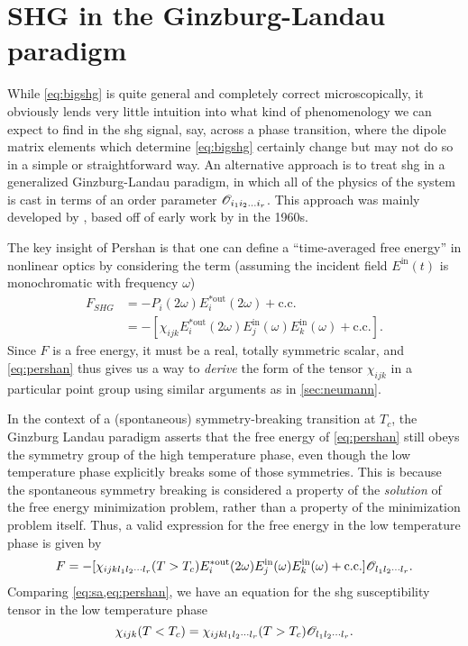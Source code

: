\section{SHG in the Ginzburg-Landau paradigm}

While \cref{eq:bigshg} is quite general and completely correct microscopically, it obviously lends very little intuition into what kind of phenomenology we can expect to find in the \gls{shg} signal, say, across a phase transition, where the dipole matrix elements which determine \cref{eq:bigshg} certainly change but may not do so in a simple or straightforward way.
An alternative approach is to treat \gls{shg} in a generalized Ginzburg-Landau paradigm, in which all of the physics of the system is cast in terms of an order parameter $\mathscr{O}_{i_1i_2...i_r}$.
This approach was mainly developed by \citet{sa_generalized_2000}, based off of early work by \citet{pershan_nonlinear_1963} in the 1960s.

The key insight of Pershan is that one can define a ``time-averaged free energy'' in nonlinear optics by considering the term (assuming the incident field $E^\mathrm{in}(t)$ is monochromatic with frequency $\omega$)
\begin{align}
F_{SHG} &= -P_i(2\omega)E_i^{*\mathrm{out}}(2\omega)+\mathrm{c.c.}\\
&= -[\chi_{ijk}E_i^{*\mathrm{out}}(2\omega)E_j^\mathrm{in}(\omega)E_k^\mathrm{in}(\omega)+\mathrm{c.c.}]\label{eq:pershan}.
\end{align}
Since $F$ is a free energy, it must be a real, totally symmetric scalar, and \cref{eq:pershan} thus gives us a way to \emph{derive} the form of the tensor $\chi_{ijk}$ in a particular point group using similar arguments as in \cref{sec:neumann}.

In the context of a (spontaneous) symmetry-breaking transition at $T_c$, the Ginzburg Landau paradigm asserts that the free energy of \cref{eq:pershan} still obeys the symmetry group of the high temperature phase, even though the low temperature phase explicitly breaks some of those symmetries.
This is because the spontaneous symmetry breaking is considered a property of the \emph{solution} of the free energy minimization problem, rather than a property of the minimization problem itself.
Thus, a valid expression for the free energy in the low temperature phase is given by
\begin{equation}\label{eq:sa}
F = -[\chi_{ijkl_1 l_2 \cdots l_r}(T>T_c)E_i^{*\mathrm{out}}(2\omega)E_j^\mathrm{in}(\omega)E_k^\mathrm{in}(\omega)+\mathrm{c.c.}]\mathscr{O}_{l_1 l_2 \cdots l_r}.
\end{equation}
Comparing \cref{eq:sa,eq:pershan}, we have an equation for the \gls{shg} susceptibility tensor in the low temperature phase
\begin{equation}\label{eq:sashg}
\chi_{ijk}(T<T_c) = \chi_{ijkl_1l_2\cdots l_r}(T>T_c)\mathscr{O}_{l_1l_2\cdots l_r}.
\end{equation}

